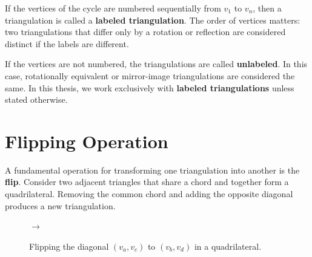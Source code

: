 If the vertices of the cycle are numbered sequentially from \(v_1\) to \(v_n\), then a triangulation is called a \textbf{labeled triangulation}. 
The order of vertices matters: two triangulations that differ only by a rotation or reflection are considered distinct if the labels are different.

If the vertices are not numbered, the triangulations are called \textbf{unlabeled}. 
In this case, rotationally equivalent or mirror-image triangulations are considered the same. 
In this thesis, we work exclusively with \textbf{labeled triangulations} unless stated otherwise.

\section{Flipping Operation}
\label{sec:flipping_operation}

A fundamental operation for transforming one triangulation into another is the \textbf{flip}. 
Consider two adjacent triangles that share a chord and together form a quadrilateral. 
Removing the common chord and adding the opposite diagonal produces a new triangulation.

\begin{figure}[htbp]
    \centering
    \qquad
    $\longrightarrow$
    \qquad
    \caption{Flipping the diagonal \((v_a, v_c)\) to \((v_b, v_d)\) in a quadrilateral.}
    \label{fig:flip_operation}
\end{figure}

